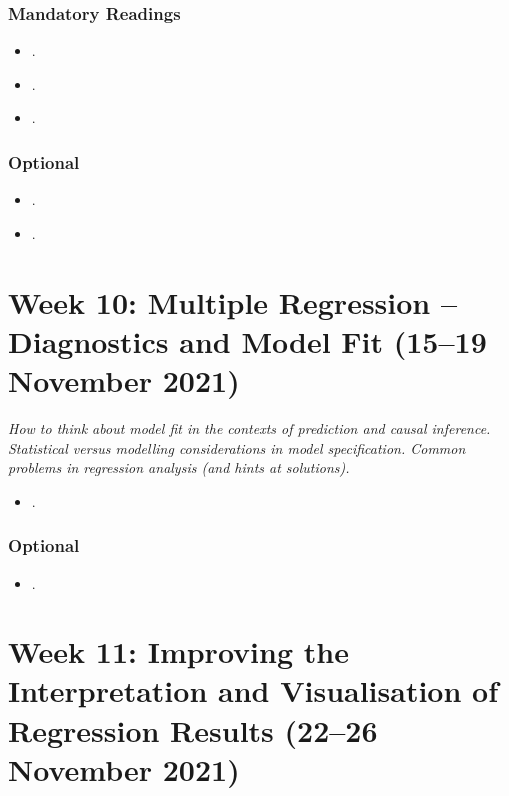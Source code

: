 \documentclass[abstract=on,parskip=full,headings=standardclasses,fontsize=11pt,paper=a4]{scrartcl}
\begin{document}
\subsubsection*{Mandatory Readings}
\begin{itemize}
\item {}.
\item {}.
\item {}.
\end{itemize}


\subsubsection*{Optional}
\begin{itemize}
\item {}.
\item {}.
\end{itemize}



\section{Week 10: Multiple Regression --  Diagnostics and Model Fit (15--19 November 2021)}


\textit{How to think about model fit in the contexts of prediction and causal inference. Statistical versus modelling considerations in model specification. Common problems in regression analysis (and hints at solutions).}

\begin{itemize}
\item {}.
\end{itemize}

\subsubsection*{Optional}
\begin{itemize}
\item {}.
\end{itemize}


\section{Week 11: Improving the Interpretation and Visualisation of Regression Results (22--26 November 2021)}
\end{document}
